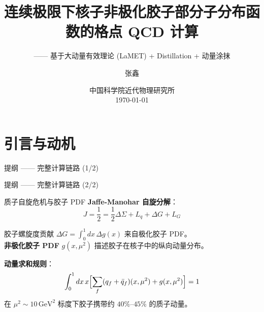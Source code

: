 \documentclass[10pt,aspectratio=169]{beamer}
\newcommand{\GeV}{\,\mathrm{GeV}}
\begin{document}
\section{引言与动机}

\begin{frame}
\title{连续极限下核子非极化胶子部分子分布函数的格点 QCD 计算}
\subtitle{—— 基于大动量有效理论 (LaMET) + Distillation + 动量涂抹}
\author{张鑫}
\date{中国科学院近代物理研究所 \\ \today}
\titlepage
\end{frame}

\begin{frame}{提纲 —— 完整计算链路 (1/2)}
\small
\tableofcontents[hideallsubsections,sections={1-7}]
\end{frame}

\begin{frame}{提纲 —— 完整计算链路 (2/2)}
\small
\tableofcontents[hideallsubsections,sections={8-14}]
\end{frame}

\begin{frame}{质子自旋危机与胶子 PDF}
\small
\textbf{Jaffe-Manohar 自旋分解}：
\begin{equation}
  J = \frac{1}{2} = \frac{1}{2}\Delta\Sigma + L_q + \Delta G + L_G
\end{equation}

胶子螺旋度贡献 $\Delta G = \int_0^1 dx \, \Delta g(x)$ 来自极化胶子 PDF。\\
\textbf{非极化胶子 PDF} $g(x,\mu^2)$ 描述胶子在核子中的纵向动量分布。

\textbf{动量求和规则}：
\begin{equation}
  \int_0^1 dx\,x\Bigl[\sum_f (q_f + \bar{q}_f)(x,\mu^2) + g(x,\mu^2)\Bigr] = 1
\end{equation}
在 $\mu^2 \sim 10\GeV^2$ 标度下胶子携带约 $40\%$--$45\%$ 的质子动量。

\begin{center}
\end{center}
\end{frame}
\end{document}
